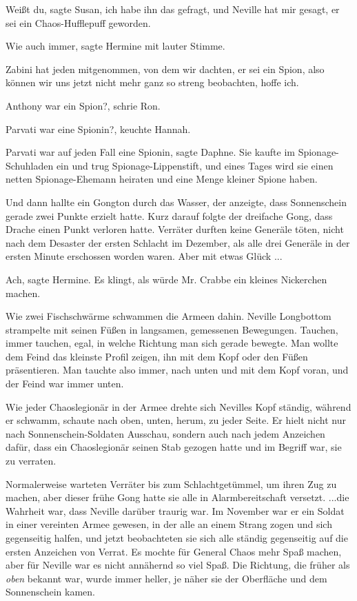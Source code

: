 \glqq{}Weißt du\grqq{}, sagte Susan, \glqq{}ich habe ihn das gefragt, und Neville
hat mir gesagt, er sei ein Chaos-Hufflepuff geworden.\grqq{}

\glqq{}Wie auch immer\grqq{}, sagte Hermine mit lauter Stimme.

\glqq{}Zabini hat jeden mitgenommen, von dem wir dachten, er sei ein Spion, also
können wir uns jetzt nicht mehr ganz so streng beobachten, hoffe ich.\grqq{}

\glqq{}Anthony war ein Spion?\grqq{}, schrie Ron.

\glqq{}Parvati war eine Spionin?\grqq{}, keuchte Hannah.

\glqq{}Parvati war auf jeden Fall eine Spionin\grqq{}, sagte Daphne. \glqq{}Sie
kaufte im Spionage-Schuhladen ein und trug Spionage-Lippenstift, und eines Tages
wird sie einen netten Spionage-Ehemann heiraten und eine Menge kleiner Spione
haben.\grqq{}

Und dann hallte ein Gongton durch das Wasser, der anzeigte, dass Sonnenschein
gerade zwei Punkte erzielt hatte. Kurz darauf folgte der dreifache Gong, dass
Drache einen Punkt verloren hatte. Verräter durften keine Generäle töten, nicht
nach dem Desaster der ersten Schlacht im Dezember, als alle drei Generäle in der
ersten Minute erschossen worden waren. Aber mit etwas Glück ...

\glqq{}Ach\grqq{}, sagte Hermine. \glqq{}Es klingt, als würde Mr. Crabbe ein
kleines Nickerchen machen.\grqq{}

Wie zwei Fischschwärme schwammen die Armeen dahin. Neville Longbottom strampelte
mit seinen Füßen in langsamen, gemessenen Bewegungen. Tauchen, immer tauchen,
egal, in welche Richtung man sich gerade bewegte. Man wollte dem Feind das
kleinste Profil zeigen, ihn mit dem Kopf oder den Füßen präsentieren. Man
tauchte also immer, nach unten und mit dem Kopf voran, und der Feind war immer
unten.

Wie jeder Chaoslegionär in der Armee drehte sich Nevilles Kopf ständig, während
er schwamm, schaute nach oben, unten, herum, zu jeder Seite. Er hielt nicht nur
nach Sonnenschein-Soldaten Ausschau, sondern auch nach jedem Anzeichen dafür,
dass ein Chaoslegionär seinen Stab gezogen hatte und im Begriff war, sie zu
verraten.

Normalerweise warteten Verräter bis zum Schlachtgetümmel, um ihren Zug zu
machen, aber dieser frühe Gong hatte sie alle in Alarmbereitschaft versetzt.
...die Wahrheit war, dass Neville darüber traurig war. Im November war er ein
Soldat in einer vereinten Armee gewesen, in der alle an einem Strang zogen und
sich gegenseitig halfen, und jetzt beobachteten sie sich alle ständig
gegenseitig auf die ersten Anzeichen von Verrat. Es mochte für General Chaos
mehr Spaß machen, aber für Neville war es nicht annähernd so viel Spaß. Die
Richtung, die früher als \emph{\glqq{}oben\grqq{}} bekannt war, wurde immer
heller, je näher sie der Oberfläche und dem Sonnenschein kamen.

